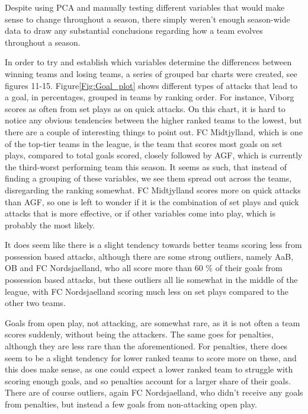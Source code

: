 \documentclass[Report.tex]{subfiles}
\begin{document}
Despite using PCA and manually testing different variables that would make sense to change throughout a season, there simply weren't enough season-wide data to draw any substantial conclusions regarding how a team evolves throughout a season.

In order to try and establish which variables determine the differences between
winning teams and losing teams, a series of grouped bar charts were created, see
figures 11-15. Figure\ref{Fig:Goal_plot} shows different types of attacks that lead to a goal,
in percentages, grouped in teams by ranking order. For instance, Viborg scores
as often from set plays as on quick attacks.
On this chart, it is hard to notice any obvious tendencies between the higher
ranked teams to the lowest, but there are a couple of interesting things to
point out. FC Midtjylland, which is one of the top-tier teams in the league, is
the team that scores most goals on set plays, compared to total goals scored,
closely followed by AGF, which is currently the third-worst performing team
this season. It seems as such, that instead of finding a grouping of these
variables, we see them spread out across the teams, disregarding the ranking
somewhat. FC Midtjylland scores more on quick attacks than AGF, so one is left
to wonder if it is the combination of set plays and quick attacks that is more
effective, or if other variables come into play, which is probably the most
likely. 

It does seem like there is a slight tendency towards better teams scoring less
from possession based attacks, although there are some strong outliers, namely
AaB, OB and FC Nordsjaelland, who all score more than 60 \% of their
goals from possession based attacks, but these outliers all lie somewhat in the
middle of the league, with FC Nordsjaelland scoring much less on set plays
compared to the other two teams. 

Goals from open play, not attacking, are somewhat rare, as it is not often a
team scores suddenly, without being the attackers. The same goes for penalties,
although they are less rare than the aforementioned. For penalties, there does
seem to be a slight tendency for lower ranked teams to score more on these, and
this does make sense, as one could expect a lower ranked team to struggle with
scoring enough goals, and so penalties account for a larger share of their
goals. There are of course outliers, again FC Nordsjaelland, who didn't receive
any goals from penalties, but instead a few goals from non-attacking open play. 
\end{document}
